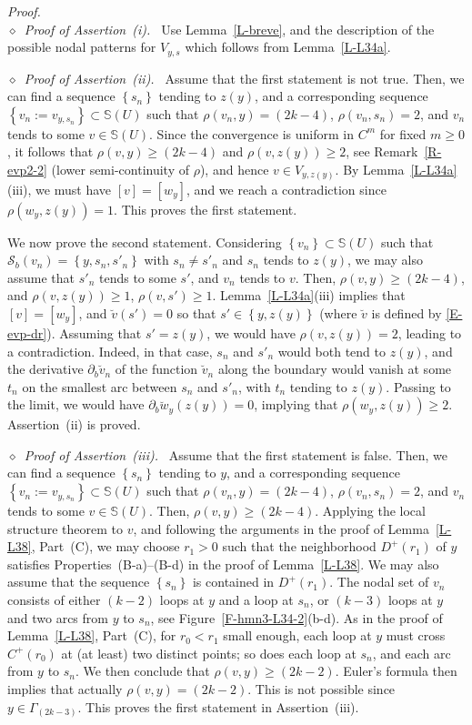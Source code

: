 \documentclass[12pt,a4paper]{amsart}
\theoremstyle{plain} %
\theoremstyle{definition}
\numberwithin{equation}{section}
\numberwithin{figure}{section}
\numberwithin{table}{section}
\newcommand{\bS}{\mathbb{S}}
\newcommand{\cS}{\mathcal{S}}
\newcommand{\pf}{\emph{Proof.~}}
\newcommand{\set}[1]{\left\lbrace #1 \right\rbrace}
\newcommand{\noid}{\noindent $\diamond$~}
\begin{document}
\pf\phantom{}\\
\noid \emph{Proof of  Assertion~(i).~} Use Lemma~\ref{L-breve}, and the description of the possible nodal patterns for $V_{y,s}$ which follows from Lemma~\ref{L-L34a}.\medskip

\noid \emph{Proof of  Assertion~(ii).~} Assume that the first statement is not true. Then, we can find a sequence $\set{s_n}$ tending to $z(y)$, and a corresponding sequence $\set{v_n := v_{y,s_n}} \subset \bS(U)$ such that $\rho(v_n,y) = (2k-4)$,  $\rho(v_n,s_n) = 2$, and $v_n$ tends to some $v \in \bS(U)$. Since the convergence is uniform in $C^m$ for fixed $m \ge 0$, it follows that $\rho(v,y) \ge (2k-4)$ and $\rho(v,z(y)) \ge 2$, see Remark~\ref{R-evp2-2}  (lower semi-continuity of $\rho$),  and hence $v \in V_{y,z(y)}$. By Lemma~\ref{L-L34a}(iii), we must have $[v]=[w_y]$, and we reach a contradiction since $\rho(w_y,z(y))=1$. This proves the first statement. \smallskip

 We now prove the second statement. Considering $\set{v_n} \subset \bS(U)$ such that $\cS_b(v_n) = \set{y,s_n,s'_n}$ with $s_n \neq s'_n$ and $s_n$ tends to $z(y)$, we may also assume that $s'_n$ tends to some $s'$, and $v_n$ tends to $v$. Then, $\rho(v,y) \ge (2k-4)$, and $\rho(v,z(y)) \ge 1$,  $\rho(v,s') \ge 1$. Lemma~\ref{L-L34a}(iii) implies that $[v] =[w_y]$, and $\breve{v}(s') = 0$ so that $s' \in \set{y,z(y)}$ (where $\breve{v}$ is defined by \eqref{E-evp-dr}). Assuming that $s' = z(y)$, we would have $\rho(v,z(y)) = 2$, leading to a contradiction. Indeed, in that case,  $s_n$ and $s'_n$ would both tend to $z(y)$, and the derivative $\partial_b \breve{v}_n$ of the function $\breve{v}_n$ along the boundary would vanish at some $t_n$ on the smallest arc between $s_n$ and $s'_n$, with $t_n$ tending to $z(y)$. Passing to the limit, we would have $\partial_b \breve{w}_y(z(y)) = 0$, implying that $\rho(w_y,z(y)) \ge 2$. Assertion~(ii) is proved.\medskip


\noid \emph{Proof of  Assertion~(iii).~} Assume that the first statement is false. Then, we can find a sequence $\set{s_n}$ tending to $y$,  and a corresponding sequence $\set{v_n := v_{y,s_n}} \subset \bS(U)$ such that $\rho(v_n,y) = (2k-4)$,  $\rho(v_n,s_n) = 2$, and $v_n$ tends to some $v \in \bS(U)$. Then, $\rho(v,y) \ge (2k-4)$. Applying the local structure theorem to $v$, and following the arguments in the proof of Lemma~\ref{L-L38},  Part~(C), we may choose $r_1 > 0$ such that the neighborhood $D^{+}(r_1)$ of $y$ satisfies Properties~(B-a)--(B-d) in the proof of Lemma~\ref{L-L38}. We may also assume that the sequence $\set{s_n}$ is contained in $D^{+}(r_1)$. The nodal set of $v_n$ consists of either $(k-2)$ loops at $y$ and a loop at $s_n$, or $(k-3)$ loops at $y$ and two arcs from $y$ to $s_n$, see Figure~\ref{F-hmn3-L34-2}(b-d).
 As in the proof of Lemma~\ref{L-L38},  Part~(C), for $r_0 < r_1$ small enough, each loop at $y$ must cross $C^{+}(r_0)$ at (at least) two distinct points; so does each loop at $s_n$, and each arc from $y$ to $s_n$. We then conclude that $\rho(v,y) \ge (2k-2)$. Euler's formula then implies that actually $\rho(v,y) = (2k-2)$. This is not possible since $y \in \Gamma_{(2k -3)}$.   This proves the first statement in Assertion~(iii).\smallskip
\end{document}
